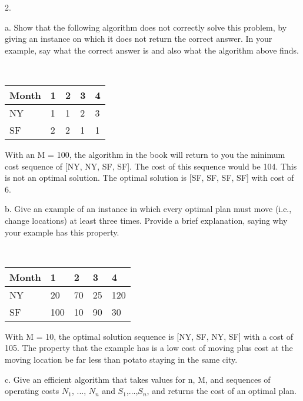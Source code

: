 \documentclass{article}
\begin{document}
2.

\indent \indent a. Show that the following algorithm does not correctly
solve this problem, by giving an instance on which it does not return the correct
answer. In your example, say what the correct answer is and also what the algorithm
above finds. \newline

{\centering\ \begin{tabu} to 0.8\textwidth { |X[c]|X[c]|X[c]|X[c]|X[c]|}
 \hline
 Month & 1 & 2 & 3 & 4\\
 \hline
 NY  & 1 & 1 & 2 & 3  \\
\hline
 SF  & 2 & 2 & 1 & 1  \\
\hline
\end{tabu} \newline \par}


With an M = 100, the algorithm in the book will return to you the minimum cost
sequence of [NY, NY, SF, SF].  The cost of this sequence would be 104.  This
is not an optimal solution.  The optimal solution is [SF, SF, SF, SF] with
cost of 6. \newline

\indent \indent b. Give an example of an instance in which every optimal plan must
move (i.e., change locations) at least three times. Provide a brief explanation,
saying why your example has this property. \newline

{\centering\ \begin{tabu} to 0.8\textwidth { |X[c]|X[c]|X[c]|X[c]|X[c]|}
 \hline
 Month & 1 & 2 & 3 & 4\\
 \hline
 NY  & 20 & 70 & 25 & 120  \\
\hline
 SF  & 100 & 10 & 90 & 30  \\
\hline
\end{tabu} \newline \par}


With M = 10, the optimal solution sequence is [NY, SF, NY, SF] with a cost of
105.  The property that the example has is a low cost of moving plus cost at
the moving location be far less than potato staying in the same city. \newline


\indent \indent c. Give an efficient algorithm that takes values for n, M,
and sequences of operating costs $N_{1}$, ..., $N_{n}$ and $S_{1}$,...,$S_{n}$,
and returns the cost of an optimal plan. \newline
\end{document}
